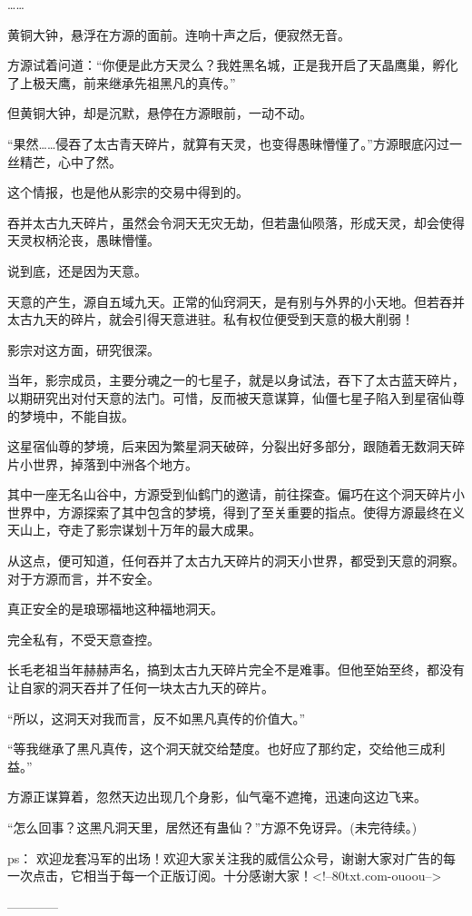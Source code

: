 \begin{this_body}
……

黄铜大钟，悬浮在方源的面前。连响十声之后，便寂然无音。

方源试着问道：“你便是此方天灵么？我姓黑名城，正是我开启了天晶鹰巢，孵化了上极天鹰，前来继承先祖黑凡的真传。”

但黄铜大钟，却是沉默，悬停在方源眼前，一动不动。

“果然……侵吞了太古青天碎片，就算有天灵，也变得愚昧懵懂了。”方源眼底闪过一丝精芒，心中了然。

这个情报，也是他从影宗的交易中得到的。

吞并太古九天碎片，虽然会令洞天无灾无劫，但若蛊仙陨落，形成天灵，却会使得天灵权柄沦丧，愚昧懵懂。

说到底，还是因为天意。

天意的产生，源自五域九天。正常的仙窍洞天，是有别与外界的小天地。但若吞并太古九天的碎片，就会引得天意进驻。私有权位便受到天意的极大削弱！

影宗对这方面，研究很深。

当年，影宗成员，主要分魂之一的七星子，就是以身试法，吞下了太古蓝天碎片，以期研究出对付天意的法门。可惜，反而被天意谋算，仙僵七星子陷入到星宿仙尊的梦境中，不能自拔。

这星宿仙尊的梦境，后来因为繁星洞天破碎，分裂出好多部分，跟随着无数洞天碎片小世界，掉落到中洲各个地方。

其中一座无名山谷中，方源受到仙鹤门的邀请，前往探查。偏巧在这个洞天碎片小世界中，方源探索了其中包含的梦境，得到了至关重要的指点。使得方源最终在义天山上，夺走了影宗谋划十万年的最大成果。

从这点，便可知道，任何吞并了太古九天碎片的洞天小世界，都受到天意的洞察。对于方源而言，并不安全。

真正安全的是琅琊福地这种福地洞天。

完全私有，不受天意查控。

长毛老祖当年赫赫声名，搞到太古九天碎片完全不是难事。但他至始至终，都没有让自家的洞天吞并了任何一块太古九天的碎片。

“所以，这洞天对我而言，反不如黑凡真传的价值大。”

“等我继承了黑凡真传，这个洞天就交给楚度。也好应了那约定，交给他三成利益。”

方源正谋算着，忽然天边出现几个身影，仙气毫不遮掩，迅速向这边飞来。

“怎么回事？这黑凡洞天里，居然还有蛊仙？”方源不免讶异。(未完待续。)

ps：    欢迎龙套冯军的出场！欢迎大家关注我的威信公众号，谢谢大家对广告的每一次点击，它相当于每一个正版订阅。十分感谢大家！<!--80txt.com-ouoou-->

------------

\end{this_body}

